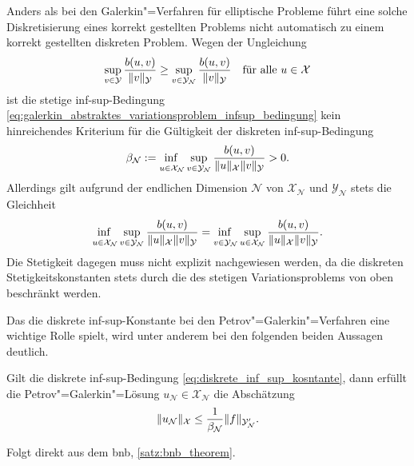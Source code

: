 \documentclass[../main.tex]{subfiles}
\begin{document}
\begin{Bemerkung}\label{bemerkung:zur_wohldefiniertheit}
    Anders als bei den Galerkin"=Verfahren für elliptische Probleme führt eine solche Diskretisierung eines korrekt gestellten Problems nicht automatisch zu einem korrekt gestellten diskreten Problem.
    Wegen der Ungleichung
    \begin{equation}
        \sup_{v \in \mathcal Y} \frac{b(u, v)}{\norm{v}_{\mathcal Y}} \geq \sup_{v \in \mathcal Y_{\mathcal N}} \frac{b(u, v)}{\norm{v}_{\mathcal Y}} \quad \fa u \in \mathcal X
    \end{equation}
    ist die stetige inf-sup-Bedingung \cref{eq:galerkin_abstraktes_variationsproblem_infsup_bedingung} kein hinreichendes Kriterium für die Gültigkeit der diskreten inf-sup-Bedingung
    \begin{equation}\label{eq:diskrete_inf_sup_kosntante}
        \beta_{\mathcal N} := \infsup{u \in \mathcal X_{\mathcal N}}{v \in \mathcal Y_{\mathcal N}} \frac{b(u, v)}{\norm{u}_{\mathcal X} \norm{v}_{\mathcal Y}} > 0.
    \end{equation}
    Allerdings gilt aufgrund der endlichen Dimension $\mathcal N$ von $\mathcal X_{\mathcal N}$ und $\mathcal Y_{\mathcal N}$ stets die Gleichheit
    \begin{equation}
        \infsup{u \in \mathcal X_{\mathcal N}}{v \in \mathcal Y_{\mathcal N}} \frac{b(u, v)}{\norm{u}_{\mathcal X} \norm{v}_{\mathcal Y}} = \infsup{v \in \mathcal Y_{\mathcal N}}{u \in \mathcal X_{\mathcal N}} \frac{b(u, v)}{\norm{u}_{\mathcal X} \norm{v}_{\mathcal Y}}.
    \end{equation}
    Die Stetigkeit dagegen muss nicht explizit nachgewiesen werden, da die diskreten Stetigkeitskonstanten stets durch die des stetigen Variationsproblems von oben beschränkt werden.
\end{Bemerkung}

Das die diskrete inf-sup-Konstante bei den Petrov"=Galerkin"=Verfahren eine wichtige Rolle spielt, wird unter anderem bei den folgenden beiden Aussagen deutlich.

\begin{Satz}\label{satz:galerkin_stabilitaet}
    Gilt die diskrete inf-sup-Bedingung \cref{eq:diskrete_inf_sup_kosntante}, dann erfüllt die Petrov"=Galerkin"=Lösung $u_{\mathcal N} \in \mathcal X_{\mathcal N}$ die Abschätzung
    \begin{equation}\label{eq:galerkin_statibilitaet}
        \norm{u_{\mathcal N}}_{\mathcal X} \leq \frac{1}{\beta_{\mathcal N}} \norm{f}_{\mathcal Y_{\mathcal N}'}.
    \end{equation}

    \begin{Beweis}
        Folgt direkt aus dem \acl{bnb}, \cref{satz:bnb_theorem}.
    \end{Beweis}
\end{Satz}
\end{document}
